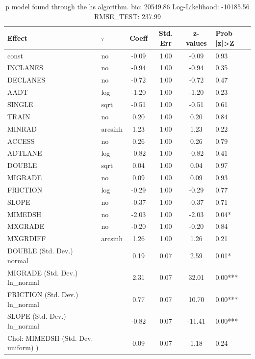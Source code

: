 \begin{table}
	\caption{p model found through the hs algorithm. bic: 20549.86 Log-Likelihood: -10185.56 RMSE_TEST: 237.99}
	\begin{center}
		\begin{tabular}{|l|l|c|c|c|l|}
			\hline
			Effect & $\tau$ & Coeff & Std. Err & z-values & Prob |z|>Z \\
			\hline
			const & no & -0.09 & 1.00 & -0.09 & 0.93 \\
			\hline
			INCLANES & no & -0.94 & 1.00 & -0.94 & 0.35 \\
			\hline
			DECLANES & no & -0.72 & 1.00 & -0.72 & 0.47 \\
			\hline
			AADT & log & -1.20 & 1.00 & -1.20 & 0.23 \\
			\hline
			SINGLE & sqrt & -0.51 & 1.00 & -0.51 & 0.61 \\
			\hline
			TRAIN & no & 0.20 & 1.00 & 0.20 & 0.84 \\
			\hline
			MINRAD & arcsinh & 1.23 & 1.00 & 1.23 & 0.22 \\
			\hline
			ACCESS & no & 0.26 & 1.00 & 0.26 & 0.79 \\
			\hline
			ADTLANE & log & -0.82 & 1.00 & -0.82 & 0.41 \\
			\hline
			DOUBLE & sqrt & 0.04 & 1.00 & 0.04 & 0.97 \\
			\hline
			MIGRADE & no & 0.09 & 1.00 & 0.09 & 0.93 \\
			\hline
			FRICTION & log & -0.29 & 1.00 & -0.29 & 0.77 \\
			\hline
			SLOPE & no & -0.37 & 1.00 & -0.37 & 0.71 \\
			\hline
			MIMEDSH & no & -2.03 & 1.00 & -2.03 & 0.04* \\
			\hline
			MXGRADE & no & -0.20 & 1.00 & -0.20 & 0.84 \\
			\hline
			MXGRDIFF & arcsinh & 1.26 & 1.00 & 1.26 & 0.21 \\
			\hline
			DOUBLE (Std. Dev.) normal &  & 0.19 & 0.07 & 2.59 & 0.01* \\
			\hline
			MIGRADE (Std. Dev.) ln_normal &  & 2.31 & 0.07 & 32.01 & 0.00*** \\
			\hline
			FRICTION (Std. Dev.) ln_normal &  & 0.77 & 0.07 & 10.70 & 0.00*** \\
			\hline
			SLOPE (Std. Dev.) ln_normal &  & -0.82 & 0.07 & -11.41 & 0.00*** \\
			\hline
			 Chol: MIMEDSH (Std. Dev. uniform) ) &  & 0.09 & 0.07 & 1.18 & 0.24 \\
			\hline

\end{tabular}
\end{center}
\end{table}
